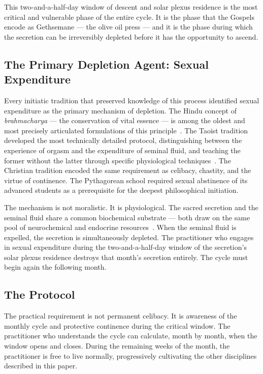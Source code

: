 \documentclass[12pt, a4paper]{article}
\begin{document}
This two-and-a-half-day window of descent and solar plexus residence is the
most critical and vulnerable phase of the entire cycle. It is the phase that
the Gospels encode as Gethsemane — the olive oil press — and it is the phase
during which the secretion can be irreversibly depleted before it has the
opportunity to ascend.

\subsection{The Primary Depletion Agent: Sexual Expenditure}

Every initiatic tradition that preserved knowledge of this process identified
sexual expenditure as the primary mechanism of depletion. The Hindu concept of
\emph{brahmacharya} — the conservation of vital essence — is among the oldest
and most precisely articulated formulations of this
principle~\autocite{yogananda1946}. The Taoist tradition developed the most
technically detailed protocol, distinguishing between the experience of orgasm
and the expenditure of seminal fluid, and teaching the former without the
latter through specific physiological techniques~\autocite{chia1983}. The
Christian tradition encoded the same requirement as celibacy, chastity, and
the virtue of continence. The Pythagorean school required sexual abstinence of
its advanced students as a prerequisite for the deepest philosophical
initiation.

The mechanism is not moralistic. It is physiological. The sacred secretion and
the seminal fluid share a common biochemical substrate — both draw on the same
pool of neurochemical and endocrine resources~\autocite{carey1920}. When the
seminal fluid is expelled, the secretion is simultaneously depleted. The
practitioner who engages in sexual expenditure during the two-and-a-half-day
window of the secretion's solar plexus residence destroys that month's
secretion entirely. The cycle must begin again the following month.

\subsection{The Protocol}

The practical requirement is not permanent celibacy. It is awareness of the
monthly cycle and protective continence during the critical window. The
practitioner who understands the cycle can calculate, month by month, when the
window opens and closes. During the remaining weeks of the month, the
practitioner is free to live normally, progressively cultivating the other
disciplines described in this paper.
\end{document}
